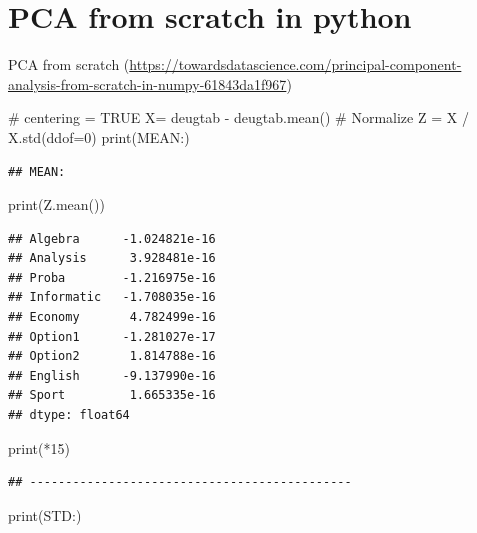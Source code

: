 \documentclass[
  10pt,
]{article}
\newenvironment{Shaded}{\begin{snugshade}}{\end{snugshade}}
\newcommand{\NormalTok}[1]{#1}
\begin{document}
\hypertarget{pca-from-scratch-in-python}{%
\section{PCA from scratch in python}\label{pca-from-scratch-in-python}}

PCA from scratch
(\url{https://towardsdatascience.com/principal-component-analysis-from-scratch-in-numpy-61843da1f967})

\begin{Shaded}
\begin{Highlighting}[]
\NormalTok{\# centering = TRUE}
\NormalTok{X= deugtab {-} deugtab.mean()}
\NormalTok{\# Normalize}
\NormalTok{Z = X / X.std(ddof=0)}
\NormalTok{print(\textquotesingle{}MEAN:\textquotesingle{})}
\end{Highlighting}
\end{Shaded}

\begin{verbatim}
## MEAN:
\end{verbatim}

\begin{Shaded}
\begin{Highlighting}[]
\NormalTok{print(Z.mean())}
\end{Highlighting}
\end{Shaded}

\begin{verbatim}
## Algebra      -1.024821e-16
## Analysis      3.928481e-16
## Proba        -1.216975e-16
## Informatic   -1.708035e-16
## Economy       4.782499e-16
## Option1      -1.281027e-17
## Option2       1.814788e-16
## English      -9.137990e-16
## Sport         1.665335e-16
## dtype: float64
\end{verbatim}

\begin{Shaded}
\begin{Highlighting}[]
\NormalTok{print(\textquotesingle{}{-}{-}{-}\textquotesingle{}*15)}
\end{Highlighting}
\end{Shaded}

\begin{verbatim}
## ---------------------------------------------
\end{verbatim}

\begin{Shaded}
\begin{Highlighting}[]
\NormalTok{print(\textquotesingle{}STD:\textquotesingle{})}
\end{Highlighting}
\end{Shaded}
\end{document}
